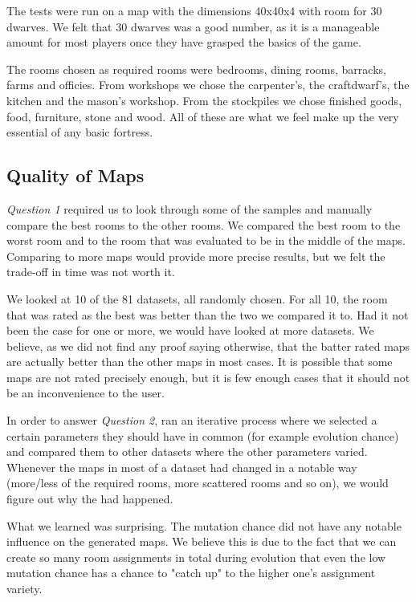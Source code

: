 The tests were run on a map with the dimensions 40x40x4 with room for 30 dwarves. We felt that 30 dwarves was a good number, as it is a manageable amount for most players once they have grasped the basics of the game.

The rooms chosen as required rooms were bedrooms, dining rooms, barracks, farms and officies. From workshops we chose the carpenter's, the craftdwarf's, the kitchen and the mason's workshop. From the stockpiles we chose finished goods, food, furniture, stone and wood. All of these are what we feel make up the very essential of any basic fortress.

\subsection{Quality of Maps}

\textit{Question 1} required us to look through some of the samples and manually compare the best rooms to the other rooms. We compared the best room to the worst room and to the room that was evaluated to be in the middle of the maps. Comparing to more maps would provide more precise results, but we felt the trade-off in time was not worth it.

We looked at 10 of the 81 datasets, all randomly chosen. For all 10, the room that was rated as the best was better than the two we compared it to. Had it not been the case for one or more, we would have looked at more datasets. We believe, as we did not find any proof saying otherwise, that the batter rated maps are actually better than the other maps in most cases. It is possible that some maps are not rated precisely enough, but it is few enough cases that it should not be an inconvenience to the user.

In order to answer \textit{Question 2}, ran an iterative process where we selected a certain parameters they should have in common (for example evolution chance) and compared them to other datasets where the other parameters varied. Whenever the maps in most of a dataset had changed in a notable way (more/less of the required rooms, more scattered rooms and so on), we would figure out why the had happened.

What we learned was surprising. The mutation chance did not have any notable influence on the generated maps. We believe this is due to the fact that we can create so many room assignments in total during evolution that even the low mutation chance has a chance to "catch up" to the higher one's assignment variety.

